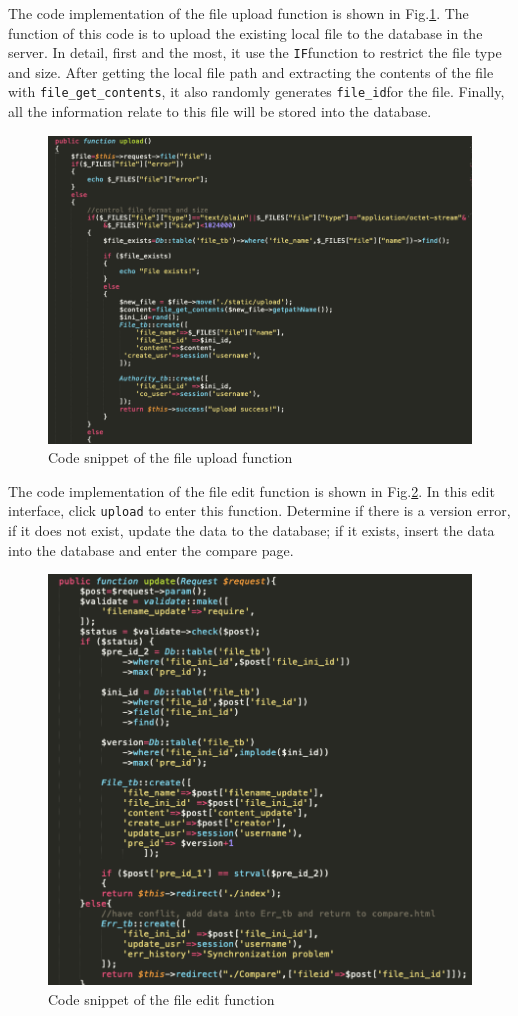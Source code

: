 \noindent The code implementation of the file upload function is shown in Fig.\ref{png4}. The function of this code is to upload the existing local file to the database in the server. In detail, first and the most, it use the \texttt{IF}function to restrict the file type and size. After getting the local file path and extracting the contents of the file with \texttt{file\_get\_contents}, it also randomly generates \texttt{file\_id}for the file. Finally, all the information relate to this file will be stored into the database.
\begin{figure}[H]
  \centering
  \includegraphics[width=.8\textwidth]{upnowfile.png} %
  \caption{Code snippet of the file upload function} %
  \label{png4} %
\end{figure}


\noindent The code implementation of the file edit function is shown in Fig.\ref{png5}. In this edit interface, click \texttt{upload} to enter this function. Determine if there is a version error, if it does not exist, update the data to the database; if it exists, insert the data into the database and enter the compare page.

\begin{figure}[H]
  \centering
  \includegraphics[width=.8\textwidth]{edit.png} %
  \caption{Code snippet of the file edit function} %
  \label{png5} %
\end{figure}


